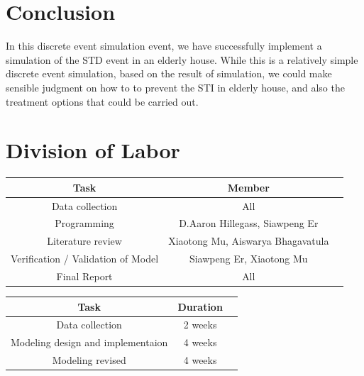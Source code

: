 \documentclass{article}
\begin{document}
\begin{normalsize}
\section{Conclusion}
In this discrete event simulation event, we have successfully implement a simulation of the STD event in an elderly house. While this is a relatively simple discrete event simulation, based on the result of  simulation, we could make sensible judgment on how to to prevent the STI in elderly house, and also the treatment options that could be carried out.


    \section{Division of Labor}
       \begin{center}
    	\begin{tabular}{ |c|c|c| } 
    		\hline
    		Task & Member  \\ 
    		\hline
    		Data collection & All \\ 
    		Programming & D.Aaron Hillegass, Siawpeng Er \\ 
    		Literature review & Xiaotong Mu, Aiswarya Bhagavatula \\ 
    		Verification / Validation of Model & Siawpeng Er, Xiaotong Mu \\
    		Final Report & All\\
    		\hline
    	\end{tabular}
    \end{center}
       
    \begin{center}
    	\begin{tabular}{ |c|c|c| } 
    		\hline
    		Task & Duration  \\ 
    		\hline
    		Data collection & 2 weeks \\ 
    		Modeling design and implementaion & 4 weeks \\ 
    		Modeling revised & 4 weeks \\ 
    		\hline
    	\end{tabular}
    \end{center}
    
    
    
    
    
\end{normalsize}
  
\end{document}
